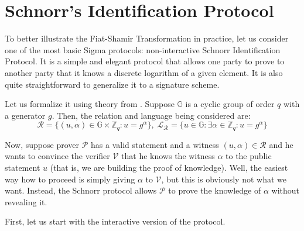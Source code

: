 \documentclass[../lecture-notes.tex]{subfiles}
\begin{document}
\section{Schnorr's Identification Protocol}

To better illustrate the Fiat-Shamir Transformation in practice, let us consider one of the most basic Sigma protocols: non-interactive Schnorr Identification Protocol. It is a simple and elegant protocol that allows one party to prove to another party that it knows a discrete logarithm of a given element. It is also quite straightforward to generalize it to a signature scheme.

Let us formalize it using theory from . Suppose $\mathbb{G}$ is a cyclic group of order $q$ with a generator $g$. Then, the relation and language being considered are:
\begin{equation*}
    \mathcal{R} = \{(u, \alpha) \in \mathbb{G} \times \mathbb{Z}_q: u = g^{\alpha}\}, \; \mathcal{L}_{\mathcal{R}} = \{u \in \mathbb{G}: \exists \alpha \in \mathbb{Z}_q: u = g^{\alpha}\}
\end{equation*}

Now, suppose prover $\mathcal{P}$ has a valid statement and a witness $(u,\alpha) \in \mathcal{R}$ and he wants to convince the verifier $\mathcal{V}$ that he knows the witness $\alpha$ to the public statement $u$ (that is, we are building the proof of knowledge). Well, the easiest way how to proceed is simply giving $\alpha$ to $\mathcal{V}$, but this is obviously not what we want. Instead, the Schnorr protocol allows $\mathcal{P}$ to prove the knowledge of $\alpha$ without revealing it. 

First, let us start with the interactive version of the protocol. 
\end{document}
